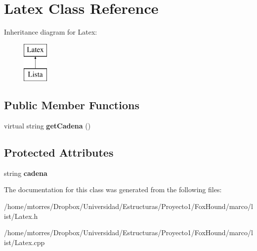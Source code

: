 \hypertarget{class_latex}{\section{Latex Class Reference}
\label{class_latex}
}
Inheritance diagram for Latex\-:\begin{figure}[H]
\begin{center}
\leavevmode
\includegraphics[height=2.000000cm]{class_latex}
\end{center}
\end{figure}
\subsection*{Public Member Functions}
\begin{DoxyCompactItemize}
\item 
\hypertarget{class_latex_ac2bec1a80e34877c5e9f3f091b5afe1a}{virtual string {\bfseries get\-Cadena} ()}\label{class_latex_ac2bec1a80e34877c5e9f3f091b5afe1a}

\end{DoxyCompactItemize}
\subsection*{Protected Attributes}
\begin{DoxyCompactItemize}
\item 
\hypertarget{class_latex_acfaf4978ad2bbd9064f1510995acd4bc}{string {\bfseries cadena}}\label{class_latex_acfaf4978ad2bbd9064f1510995acd4bc}

\end{DoxyCompactItemize}


The documentation for this class was generated from the following files\-:\begin{DoxyCompactItemize}
\item 
/home/mtorres/\-Dropbox/\-Universidad/\-Estructuras/\-Proyecto1/\-Fox\-Hound/marco/list/Latex.\-h\item 
/home/mtorres/\-Dropbox/\-Universidad/\-Estructuras/\-Proyecto1/\-Fox\-Hound/marco/list/Latex.\-cpp\end{DoxyCompactItemize}
